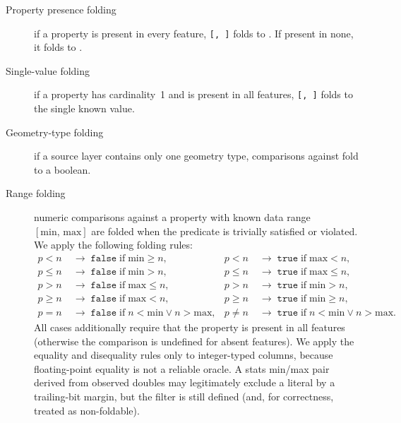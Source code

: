 \begin{description}
    \item[Property presence folding] if a property is present in every feature, \texttt{[,~]} folds to .
If present in none, it folds to .
    \item[Single-value folding] if a property has cardinality~1 and is present in all features, \texttt{[,~]} folds to the single known value.
    \item[Geometry-type folding] if a source layer contains only one geometry type, comparisons against  fold to a boolean.
    \item[Range folding] numeric comparisons against a property with known data range $[\mathrm{min},\, \mathrm{max}]$ are folded when the predicate is trivially satisfied or violated.
    We apply the following folding rules:
    \begin{equation}\label{eq:range_folding}
    \begin{aligned}
        p < n  &\;\to\; \mathtt{false} \;\text{if}\; \mathrm{min} \geq n, &
        p < n  &\;\to\; \mathtt{true}  \;\text{if}\; \mathrm{max} < n, \\
        p \leq n &\;\to\; \mathtt{false} \;\text{if}\; \mathrm{min} > n, &
        p \leq n &\;\to\; \mathtt{true}  \;\text{if}\; \mathrm{max} \leq n, \\
        p > n  &\;\to\; \mathtt{false} \;\text{if}\; \mathrm{max} \leq n, &
        p > n  &\;\to\; \mathtt{true}  \;\text{if}\; \mathrm{min} > n, \\
        p \geq n &\;\to\; \mathtt{false} \;\text{if}\; \mathrm{max} < n, &
        p \geq n &\;\to\; \mathtt{true}  \;\text{if}\; \mathrm{min} \geq n, \\
        p = n  &\;\to\; \mathtt{false} \;\text{if}\; n < \mathrm{min} \lor n > \mathrm{max}, &
        p \neq n &\;\to\; \mathtt{true}  \;\text{if}\; n < \mathrm{min} \lor n > \mathrm{max}.
    \end{aligned}
    \end{equation}
    All cases additionally require that the property is present in all features (otherwise the comparison is undefined for absent features).
    We apply the equality and disequality rules only to integer-typed columns, because floating-point equality is not a reliable oracle.
    A stats min/max pair derived from observed doubles may legitimately exclude a literal by a trailing-bit margin, but the filter is still defined (and, for correctness, treated as non-foldable).

\end{description}
